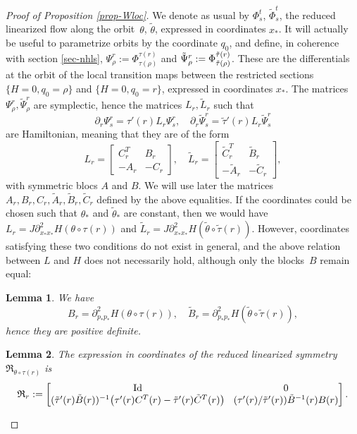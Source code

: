 \documentclass[JEP,XML,SOM,Unicode,published]{cedram}
\DeclareMathOperator{\Id}{Id}
\newcommand{\gR}{\ensuremath{\mathfrak{R}}}
\theoremstyle{plain}
\newtheorem{lem}{Lemma}
\theoremstyle{definition}
\begin{document}
\begin{proof}[Proof of Proposition \ref{prop-Wloc}]
We denote as usual by $\Phi_s^t$, \resp $\tilde \Phi_s^t$, the reduced linearized flow along the orbit~$\theta$, \resp $\tilde \theta$, expressed in coordinates $x_*$.
It will actually be useful to parametrize orbits by the coordinate $q_0$, and define, in coherence with section \ref{sec-nhls}, $\Psi_{\rho}^r:= \Phi_{\tau(\rho)}^{\tau(r)}$ and
$\tilde \Psi_{\rho}^r:=\nobreak\Phi_{\tilde \tau(\rho)}^{\tilde \tau(r)}$. These are the differentials at the orbit of the local transition maps between the restricted sections $\{H=0, q_0=\rho \}$ and $\{H=0, q_0=r \}$, expressed in coordinates $x_*$.
The matrices $\Psi_{\rho}^r, \tilde \Psi_{\rho}^r$ are symplectic, hence the matrices $L_r, \tilde L_r$ such that
\[
\partial_r \Psi_s^r=\tau'(r)L_r \Psi_s^r, \quad
\partial_r \tilde \Psi_s^r=\tilde \tau'(r)L_r \tilde \Psi_s^r
\]
are Hamiltonian, meaning that they are of the form
\[
L_r=\begin{bmatrix}
C_r^T & B_r\\-A_r &-C _r
\end{bmatrix}
, \quad
\tilde L_r=\begin{bmatrix}
\tilde C_r^T & \tilde B_r\\-\tilde A_r &-\tilde C _r
\end{bmatrix},
\]
with symmetric blocs $A$ and $B$. We will use later the matrices $A_r, B_r, C_r, \tilde A_r, \tilde B_r, \tilde C_r$ defined by the above equalities.
If the coordinates could be chosen such that $\theta_*$ and $\tilde \theta_* $ are constant, then we would have $L_r=J\partial^2_{x_*x_*}H(\theta\circ \tau(r))$ and $\tilde L_r=J\partial^2_{x_*x_*}H(\tilde \theta \circ\tilde \tau(r))$.
However, coordinates satisfying these two conditions do not exist in general, and the above relation between $L$ and $H$ does not necessarily hold,
although only the blocks~$B$ remain equal:

\begin{lem}\label{lem-reduc}
We have
\[
B_r= \partial^2_{p_*p_*}H(\theta\circ \tau(r)), \quad \tilde B_r= \partial^2_{p_*p_*}H(\tilde \theta\circ \tilde \tau(r)),
\]
hence they are positive definite.
\end{lem}

\begin{lem}\label{lem-R}
The expression in coordinates of the reduced linearized symmetry $\gR_{\theta\circ \tau(r)}$ is
\[\arraycolsep4.5pt
\gR_{r}:=
\begin{bmatrix}
\Id&0\\
(\tilde \tau'(r)\tilde B(r))^{-1}\big(\tau'(r)C^T(r)-\tilde \tau'(r) \tilde C^T(r)\big) & (\tau'(r)/\tilde \tau'(r)) \tilde B^{-1}(r) B(r)
\end{bmatrix}.
\]
\end{lem}


\end{proof}
\end{document}
